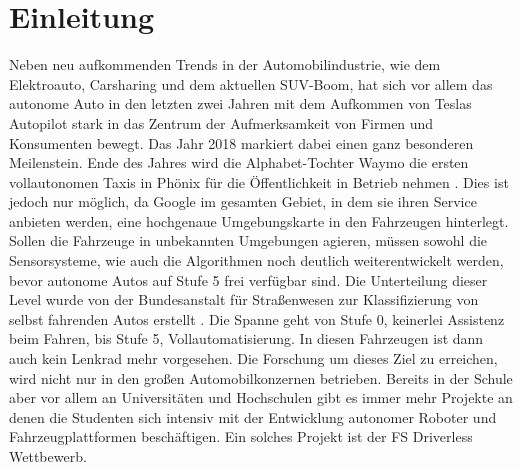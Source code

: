 \documentclass{like}
\begin{document}
  








\setcounter{page}{1}   %

\chapter{Einleitung}
Neben neu aufkommenden Trends in der Automobilindustrie, wie dem Elektroauto, Carsharing und dem aktuellen SUV-Boom, hat sich vor allem das autonome Auto in den letzten zwei Jahren mit dem Aufkommen von Teslas Autopilot stark in das Zentrum der Aufmerksamkeit von Firmen und Konsumenten bewegt. Das Jahr 2018 markiert dabei einen ganz besonderen Meilenstein. 
Ende des Jahres wird die Alphabet-Tochter Waymo die ersten vollautonomen Taxis in Phönix für die Öffentlichkeit in Betrieb nehmen \cite{Waymo:1}. 
Dies ist jedoch nur möglich, da Google im gesamten Gebiet, in dem sie ihren Service anbieten werden, eine hochgenaue Umgebungskarte in den Fahrzeugen hinterlegt. Sollen die Fahrzeuge in unbekannten Umgebungen agieren, müssen sowohl die Sensorsysteme, wie auch die Algorithmen noch deutlich weiterentwickelt werden, bevor autonome Autos auf Stufe 5 frei verfügbar sind. Die Unterteilung dieser Level wurde von der Bundesanstalt für Straßenwesen zur Klassifizierung von selbst fahrenden Autos erstellt \cite{BASt5L}. Die Spanne geht von Stufe 0, keinerlei Assistenz beim Fahren, bis Stufe 5, Vollautomatisierung. In diesen Fahrzeugen ist dann auch kein Lenkrad mehr vorgesehen. 
Die Forschung um dieses Ziel zu erreichen, wird nicht nur in den großen Automobilkonzernen betrieben. Bereits in der Schule aber vor allem an Universitäten und Hochschulen gibt es immer mehr Projekte an denen die Studenten sich intensiv mit der Entwicklung autonomer Roboter und Fahrzeugplattformen beschäftigen. Ein solches Projekt ist der \ac{FS} Driverless Wettbewerb.
\end{document}
